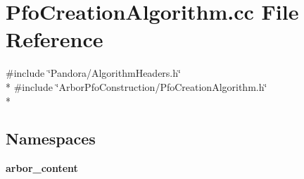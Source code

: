 \section{Pfo\+Creation\+Algorithm.\+cc File Reference}
\label{PfoCreationAlgorithm_8cc}
{\ttfamily \#include \char`\"{}Pandora/\+Algorithm\+Headers.\+h\char`\"{}}\\*
{\ttfamily \#include \char`\"{}Arbor\+Pfo\+Construction/\+Pfo\+Creation\+Algorithm.\+h\char`\"{}}\\*
\subsection*{Namespaces}
\begin{DoxyCompactItemize}
\item 
 {\bf arbor\+\_\+content}
\end{DoxyCompactItemize}
